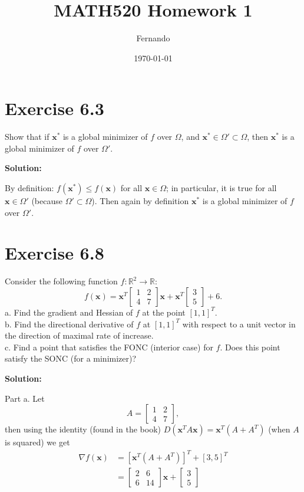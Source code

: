 \documentclass{article}
\newcommand{\bld}[1]{\boldsymbol{#1}}
\begin{document}
\title{MATH520 Homework 1}
\author{Fernando}
\date{\today}
\maketitle

\section*{Exercise 6.3}
Show that if $\bld{x}^*$ is a global minimizer of $f$ over $\Omega$, and
$\bld{x}^*\in\Omega'\subset \Omega$, then $\bld{x}^*$ is a global minimizer of $f$ over
$\Omega'$.

\textbf{Solution:}

By definition: $f(\bld{x}^*)\leq f(\bld{x})$ for all $\bld{x}\in \Omega$; in
particular, it is true for all $\bld{x}\in\Omega'$ (because $\Omega'\subset
\Omega$). Then again by definition $\bld{x}^*$ is a global minimizer of $f$
over $\Omega'$.
\section*{Exercise 6.8}
Consider the following function $f:\mathbb{R}^2 \to \mathbb{R}$:
\[
	f(\bld{x})=\bld{x}^T
	\begin{bmatrix}
	1 & 2\\
	4 & 7
	\end{bmatrix}
	\bld{x} + \bld{x}^T
	\begin{bmatrix}
	3\\
	5
	\end{bmatrix}
	+ 6.
\]
a. Find the gradient and Hessian of $f$ at the point $[1,1]^T$.\\
b. Find the directional derivative of $f$ at $[1,1]^T$ with respect to a unit
vector in the direction of maximal rate of increase.\\
c. Find a point that satisfies the FONC (interior case) for $f$. Does this
point satisfy the SONC (for a minimizer)?

\textbf{Solution:}

Part a. Let
\[
	A = \begin{bmatrix}
		1 & 2\\
		4 & 7
	\end{bmatrix},
\]
then using the identity (found in the book)
$D(\bld{x}^TA\bld{x})=\bld{x}^T(A+A^T)$ (when $A$ is squared) we get
\begin{align*}
\nabla f(\bld{x}) &= \left[\bld{x}^T(A+A^T)\right]^T + [3,5]^T\\
&= \begin{bmatrix}
	2 & 6\\
	6 & 14
\end{bmatrix}\bld{x} + \begin{bmatrix}
3\\
5
\end{bmatrix}
\end{align*}
\end{document}
